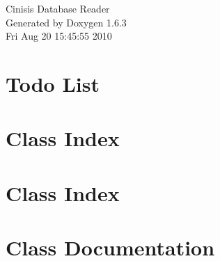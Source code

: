 \documentclass[a4paper]{book}
\begin{document}
\hypersetup{pageanchor=false}
\begin{titlepage}
\vspace*{7cm}
\begin{center}
{\Large Cinisis Database Reader }\\
\vspace*{1cm}
{\large Generated by Doxygen 1.6.3}\\
\vspace*{0.5cm}
{\small Fri Aug 20 15:45:55 2010}\\
\end{center}
\end{titlepage}
\clearemptydoublepage
{}
\tableofcontents
\clearemptydoublepage
{}
\hypersetup{pageanchor=true}
\chapter{Todo List}
\label{todo}
\hypertarget{todo}{}

\chapter{Class Index}

\chapter{Class Index}

\chapter{Class Documentation}





















\printindex
\end{document}
